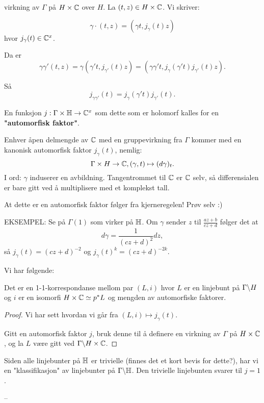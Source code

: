 \message{ !name(seminar30april15.tex)}\documentclass[11pt, english]{article}
\begin{document}
virkning av $\Gamma$ på $H \times \mathbb{C}$ over $H$.  La $(t,z) \in H \times \mathbb{C}$. Vi skriver:

$$
\gamma \cdot (t,z) = \left( \gamma t , j_\gamma(t)z \right)
$$
hvor $j_\gamma(t) \in \mathbb{C}^x$. 

Da er 
$$
\gamma \gamma' (t,z) = \gamma(\gamma' t, j_{\gamma '}(t)z ) = (\gamma \gamma' t, j_{\gamma}(\gamma' t) j_{\gamma'}(t) z).
$$

Så
$$
j_{\gamma \gamma'}(t) = j_\gamma(\gamma' t) j_{\gamma'}(t).
$$

En funksjon $j:\Gamma \times \mathbb{H} \to \mathbb{C}^x$ som dette som er holomorf kalles for en \textbf{"automorfisk faktor"}.

\begin{example}
Enhver åpen delmengde av $\mathbb{C}$ med en gruppevirkning fra $\Gamma$ kommer med en kanonisk automorfisk faktor $j_\gamma(t)$, nemlig:
\[
\Gamma \times H \to \mathbb{C}, (\gamma, t) \mapsto (d\gamma)_t.
\]
I ord: $\gamma$ induserer en avbildning. Tangentrommet til $\mathbb{C}$ er $\mathbb{C}$ selv, så differensialen er bare gitt ved å multiplisere med et komplekst tall. 

At dette er en automorfisk faktor følger fra kjerneregelen! Prøv selv :)

EKSEMPEL: Se på $\Gamma(1)$ som virker på $\mathbb{H}$. Om $\gamma$ sender $z$ til $\frac{az+b}{cz+d}$ følger det at 
$$
d\gamma = \frac{1}{(cz+d)^2} dz,
$$
så $j_\gamma(t)= (cz+d)^{-2}$ og $j_\gamma(t)^k= (cz+d)^{-2k}$. 
\end{example}

Vi har følgende:
\begin{prop}
Det er en 1-1-korrespondanse mellom par $(L,i)$ hvor $L$ er en linjebunt på $\Gamma \backslash H$ og $i$ er en isomorfi $H \times \mathbb{C} \simeq p^\ast L$ og mengden av automorfiske faktorer.
\end{prop}
\begin{proof}
Vi har sett hvordan vi går fra $(L,i) \mapsto j_\gamma(t)$. 

Gitt en automorfisk faktor $j$, bruk denne til å definere en virkning av $\Gamma$ på $H \times \mathbb{C}$, og la $L$ være gitt ved $\Gamma \backslash H \times \mathbb{C}$.
\end{proof}

Siden alle linjebunter på $\mathbb{H}$ er trivielle (finnes det et kort bevis for dette?), har vi en "klassifikasjon" av linjebunter på $\Gamma \backslash \mathbb{H}$. Den trivielle linjebunten svarer til $j=1$. 


--
\end{document}
